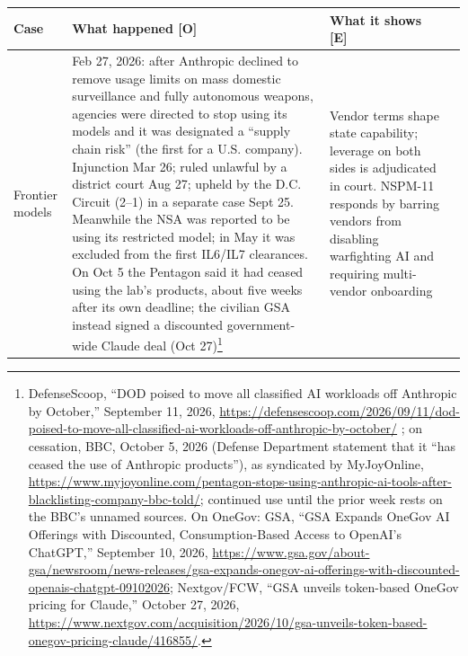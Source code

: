 \documentclass[11pt,letterpaper]{article}
\begin{document}
\begin{center}
\scriptsize
\begin{tabularx}{\linewidth}{ZY{0.44}Y{1.49}Y{1.07}}
\toprule
\textbf{Case} & \textbf{What happened [O]} & \textbf{What it shows [E]} \\
\midrule
Frontier models & Feb 27, 2026: after Anthropic declined to remove usage limits on mass domestic surveillance and fully autonomous weapons, agencies were directed to stop using its models and it was designated a ``supply chain risk'' (the first for a U.S. company). Injunction Mar 26; ruled unlawful by a district court Aug 27; upheld by the D.C. Circuit (2--1) in a separate case Sept 25. Meanwhile the NSA was reported to be using its restricted model; in May it was excluded from the first IL6/IL7 clearances. On Oct 5 the Pentagon said it had ceased using the lab's products, about five weeks after its own deadline; the civilian GSA instead signed a discounted government-wide Claude deal (Oct 27)\footnote{DefenseScoop, ``DOD poised to move all classified AI workloads off Anthropic by October,'' September 11, 2026, \url{https://defensescoop.com/2026/09/11/dod-poised-to-move-all-classified-ai-workloads-off-anthropic-by-october/} ; on cessation, BBC, October 5, 2026 (Defense Department statement that it ``has ceased the use of Anthropic products''), as syndicated by MyJoyOnline, \url{https://www.myjoyonline.com/pentagon-stops-using-anthropic-ai-tools-after-blacklisting-company-bbc-told/}; continued use until the prior week rests on the BBC's unnamed sources. On OneGov: GSA, ``GSA Expands OneGov AI Offerings with Discounted, Consumption-Based Access to OpenAI's ChatGPT,'' September 10, 2026, \url{https://www.gsa.gov/about-gsa/newsroom/news-releases/gsa-expands-onegov-ai-offerings-with-discounted-openais-chatgpt-09102026}; Nextgov/FCW, ``GSA unveils token-based OneGov pricing for Claude,'' October 27, 2026, \url{https://www.nextgov.com/acquisition/2026/10/gsa-unveils-token-based-onegov-pricing-claude/416855/}.} & Vendor terms shape state capability; leverage on both sides is adjudicated in court. NSPM-11 responds by barring vendors from disabling warfighting AI and requiring multi-vendor onboarding \\
\end{tabularx}
\end{center}
\end{document}
